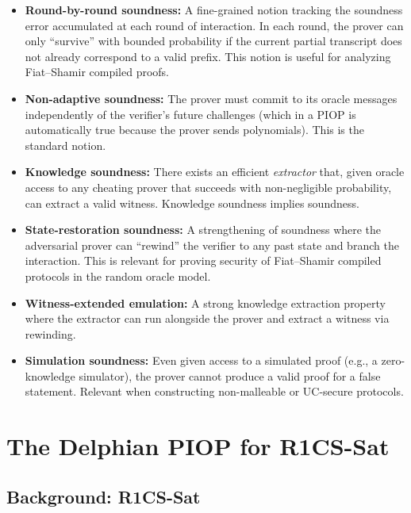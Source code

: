 \documentclass[11pt]{article}
\theoremstyle{plain}
\theoremstyle{definition}
\begin{document}
\begin{itemize}
  \item \textbf{Round-by-round soundness:} A fine-grained notion tracking the
    soundness error accumulated at each round of interaction. In each round, the
    prover can only ``survive'' with bounded probability if the current partial
    transcript does not already correspond to a valid prefix. This notion is
    useful for analyzing Fiat--Shamir compiled proofs.

  \item \textbf{Non-adaptive soundness:} The prover must commit to its oracle
    messages independently of the verifier's future challenges (which in a
    PIOP is automatically true because the prover sends polynomials). This is
    the standard notion.

  \item \textbf{Knowledge soundness:} There exists an efficient \emph{extractor}
    that, given oracle access to any cheating prover that succeeds with
    non-negligible probability, can extract a valid witness. Knowledge soundness
    implies soundness.

  \item \textbf{State-restoration soundness:} A strengthening of soundness where
    the adversarial prover can ``rewind'' the verifier to any past state and
    branch the interaction. This is relevant for proving security of
    Fiat--Shamir compiled protocols in the random oracle model.

  \item \textbf{Witness-extended emulation:} A strong knowledge extraction
    property where the extractor can run alongside the prover and extract a
    witness via rewinding.

  \item \textbf{Simulation soundness:} Even given access to a simulated proof
    (e.g., a zero-knowledge simulator), the prover cannot produce a valid proof
    for a false statement. Relevant when constructing non-malleable or
    UC-secure protocols.
\end{itemize}

\section{The Delphian PIOP for R1CS-Sat}

\subsection{Background: R1CS-Sat}
\end{document}
